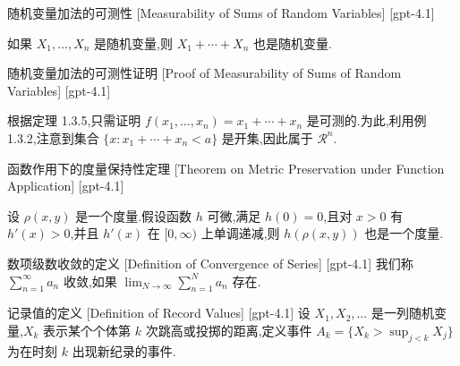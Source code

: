 \documentclass[UTF8]{ctexart}
\begin{document}
    
    
    \begin{thm}
        {随机变量加法的可测性}
        [Measurability of Sums of Random Variables]
        [gpt-4.1]
        
如果 $X_{1}, \ldots, X_{n}$ 是随机变量,则 $X_{1} + \cdots + X_{n}$ 也是随机变量.

    \end{thm}
    
    
    
    \begin{prf}
        {随机变量加法的可测性证明}
        [Proof of Measurability of Sums of Random Variables]
        [gpt-4.1]
        
根据定理 1.3.5,只需证明 $f(x_{1}, \ldots, x_{n}) = x_{1} + \cdots + x_{n}$ 是可测的.为此,利用例 1.3.2,注意到集合 $\{ x : x_{1} + \cdots + x_{n} < a \}$ 是开集,因此属于 $\mathcal{R}^{n}$.

    \end{prf}
    
    
    
    \begin{thm}
        {函数作用下的度量保持性定理}
        [Theorem on Metric Preservation under Function Application]
        [gpt-4.1]
        
设 $\rho(x, y)$ 是一个度量.假设函数 $h$ 可微,满足 $h(0) = 0$,且对 $x > 0$ 有 $h'(x) > 0$,并且 $h'(x)$ 在 $[0, \infty)$ 上单调递减,则 $h(\rho(x, y))$ 也是一个度量.

    \end{thm}
    
    
    
    \begin{dfn}
        {数项级数收敛的定义}
        [Definition of Convergence of Series]
        [gpt-4.1]
        我们称 $\sum_{n=1}^{\infty} a_{n}$ 收敛,如果 $\lim_{N \to \infty} \sum_{n=1}^{N} a_{n}$ 存在.
    \end{dfn}
    
    
    
    \begin{dfn}
        {记录值的定义}
        [Definition of Record Values]
        [gpt-4.1]
        设 $X_1, X_2, \dots$ 是一列随机变量,$X_k$ 表示某个个体第 $k$ 次跳高或投掷的距离,定义事件 $A_k = \{ X_k > \sup_{j < k} X_j \}$ 为在时刻 $k$ 出现新纪录的事件.
    \end{dfn}
    
\end{document}
